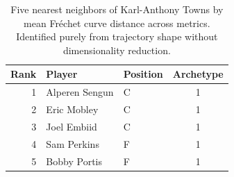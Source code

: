 \begin{table}[htbp]
  \centering\small
  \begin{tabular}{rllc}
    \toprule
    Rank & Player & Position & Archetype \\
    \midrule
    1 & Alperen Sengun & C & 1 \\
    2 & Eric Mobley & C & 1 \\
    3 & Joel Embiid & C & 1 \\
    4 & Sam Perkins & F & 1 \\
    5 & Bobby Portis & F & 1 \\
    \bottomrule
  \end{tabular}
  \caption{Five nearest neighbors of Karl-Anthony Towns by mean Fr\'{e}chet curve distance across metrics. Identified purely from trajectory shape without dimensionality reduction.}
  \label{tab:Karl_Anthony_Towns_frechet_curve_neighbors}
\end{table}


